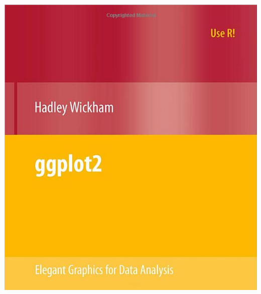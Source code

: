 \documentclass{beamer}\usepackage[]{graphicx}\usepackage[]{color}
\begin{document}
\begin{frame}[fragile]
\begin{center}
\includegraphics[scale=.15]{images/hadley.png}
\end{center}
\end{frame}

\end{document}
